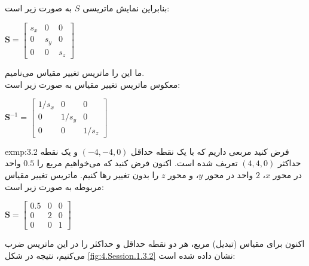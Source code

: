 {\begin{spacing}{1.5}
        بنابراین نمایش ماتریسی $S$ به صورت زیر است:

        \begin{center}
            $\textbf{S}=\begin{bmatrix}
                            s_x & 0   & 0   \\
                            0   & s_y & 0   \\
                            0   & 0   & s_z
            \end{bmatrix}$
        \end{center}

        ما این را ماتریس تغییر مقیاس می‌نامیم.\\
        معکوس ماتریس تغییر مقیاس به صورت زیر است:

        \begin{center}
            $\textbf{S}^{-1}=\begin{bmatrix}
                                 1/s_x & 0     & 0     \\
                                 0     & 1/s_y & 0     \\
                                 0     & 0     & 1/s_z
            \end{bmatrix}$
        \end{center}
        \begin{exmp}{exmp:3.2}
            \Large
            فرض کنید مربعی داریم که با یک نقطه حداقل $(-4,-4, 0)$ و یک نقطه حداکثر $(4,4,0)$ تعریف شده است.
            اکنون فرض کنید که می‌خواهیم مربع را $0.5$ واحد در محور $x$، $2$ واحد در محور $y$، و محور $z$ را بدون تغییر رها کنیم.
            ماتریس تغییر مقیاس مربوطه به صورت زیر است:

            \begin{center}
                $\textbf{S}=\begin{bmatrix}
                                0.5 & 0 & 0 \\
                                0   & 2 & 0 \\
                                0   & 0 & 1
                \end{bmatrix}$
            \end{center}

            اکنون برای مقیاس (تبدیل) مربع، هر دو نقطه حداقل و حداکثر را در این ماتریس ضرب می‌کنیم، نتیجه در شکل \ref{fig:4.Session.1.3.2} نشان داده شده است:


\end{exmp}
\end{spacing}}
